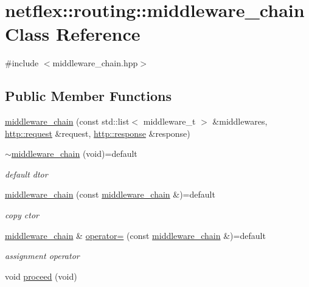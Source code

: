 \hypertarget{classnetflex_1_1routing_1_1middleware__chain}{}\section{netflex\+:\+:routing\+:\+:middleware\+\_\+chain Class Reference}
\label{classnetflex_1_1routing_1_1middleware__chain}


{\ttfamily \#include $<$middleware\+\_\+chain.\+hpp$>$}

\subsection*{Public Member Functions}
\begin{DoxyCompactItemize}
\item 
\hyperlink{classnetflex_1_1routing_1_1middleware__chain_a1ca46e620562de94f0f18bda55d5dc6b}{middleware\+\_\+chain} (const std\+::list$<$ middleware\+\_\+t $>$ \&middlewares, \hyperlink{classnetflex_1_1http_1_1request}{http\+::request} \&request, \hyperlink{classnetflex_1_1http_1_1response}{http\+::response} \&response)
\item 
\mbox{\label{classnetflex_1_1routing_1_1middleware__chain_a146dc01f9446f08f5e82d5c45fce9ca5}} 
\hyperlink{classnetflex_1_1routing_1_1middleware__chain_a146dc01f9446f08f5e82d5c45fce9ca5}{$\sim$middleware\+\_\+chain} (void)=default
\begin{DoxyCompactList}\small\item\em default dtor \end{DoxyCompactList}\item 
\mbox{\label{classnetflex_1_1routing_1_1middleware__chain_ae9735fec43573278a01312692c5aff55}} 
\hyperlink{classnetflex_1_1routing_1_1middleware__chain_ae9735fec43573278a01312692c5aff55}{middleware\+\_\+chain} (const \hyperlink{classnetflex_1_1routing_1_1middleware__chain}{middleware\+\_\+chain} \&)=default
\begin{DoxyCompactList}\small\item\em copy ctor \end{DoxyCompactList}\item 
\mbox{\label{classnetflex_1_1routing_1_1middleware__chain_a292af104bd22249848832886cdd40587}} 
\hyperlink{classnetflex_1_1routing_1_1middleware__chain}{middleware\+\_\+chain} \& \hyperlink{classnetflex_1_1routing_1_1middleware__chain_a292af104bd22249848832886cdd40587}{operator=} (const \hyperlink{classnetflex_1_1routing_1_1middleware__chain}{middleware\+\_\+chain} \&)=default
\begin{DoxyCompactList}\small\item\em assignment operator \end{DoxyCompactList}\item 
void \hyperlink{classnetflex_1_1routing_1_1middleware__chain_a762a6cce9e788dd6bb3261336d4bb841}{proceed} (void)
\end{DoxyCompactItemize}


